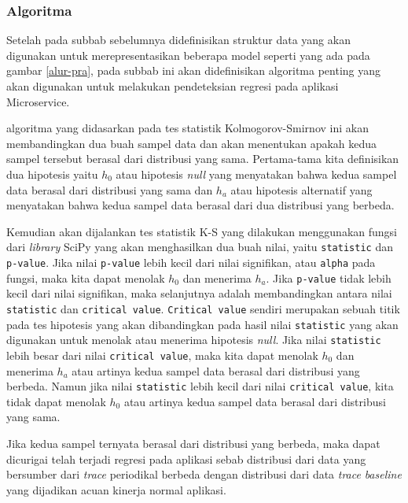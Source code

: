 \subsubsection{Algoritma}
Setelah pada subbab sebelumnya didefinisikan struktur data yang akan digunakan untuk merepresentasikan beberapa model seperti yang ada pada gambar \ref{alur-pra}, pada subbab ini akan didefinisikan algoritma penting yang akan digunakan untuk melakukan pendeteksian regresi pada aplikasi Microservice. 

algoritma yang didasarkan pada tes statistik Kolmogorov-Smirnov ini akan membandingkan dua buah sampel data dan akan menentukan apakah kedua sampel tersebut berasal dari distribusi yang sama. Pertama-tama kita definisikan dua hipotesis yaitu $h_{0}$ atau hipotesis \textit{null} yang menyatakan bahwa kedua sampel data berasal dari distribusi yang sama dan $h_{a}$ atau hipotesis alternatif yang menyatakan bahwa kedua sampel data berasal dari dua distribusi yang berbeda. 

Kemudian akan dijalankan tes statistik K-S yang dilakukan menggunakan fungsi dari \textit{library}
SciPy yang akan menghasilkan dua buah nilai, yaitu \texttt{statistic} dan \texttt{p-value}. Jika nilai \texttt{p-value} lebih kecil dari nilai signifikan, atau \texttt{alpha} pada fungsi,  maka kita dapat menolak $h_{0}$ dan menerima $h_{a}$. Jika  \texttt{p-value} tidak lebih kecil dari nilai signifikan, maka selanjutnya adalah membandingkan antara nilai \texttt{statistic} dan \texttt{critical value}. \texttt{Critical value} sendiri merupakan sebuah titik pada tes hipotesis yang akan dibandingkan pada hasil nilai \texttt{statistic} yang akan digunakan untuk menolak atau menerima hipotesis \textit{null}. Jika nilai \texttt{statistic} lebih besar dari nilai \texttt{critical value}, maka kita dapat menolak $h_{0}$ dan menerima $h_{a}$ atau artinya kedua sampel data berasal dari distribusi yang berbeda. Namun jika  nilai \texttt{statistic} lebih kecil dari nilai \texttt{critical value}, kita tidak dapat menolak $h_{0}$ atau artinya kedua sampel data berasal dari distribusi yang sama.


Jika kedua sampel ternyata berasal dari distribusi yang berbeda, maka dapat dicurigai telah terjadi regresi pada aplikasi sebab distribusi dari data yang bersumber dari  \textit{trace} periodikal berbeda dengan distribusi dari data \textit{trace} \textit{baseline} yang dijadikan acuan kinerja normal aplikasi.




